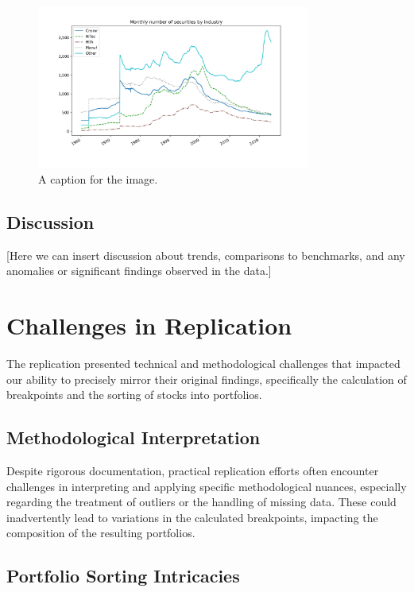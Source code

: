 \documentclass{article}
\begin{document}
\begin{figure}[ht]
  \centering
  \includegraphics[width=0.8\textwidth]{output/sec_per_ind_5.png}
  \caption{A caption for the image.}
  \label{fig:my_label}
\end{figure}



\subsection*{Discussion}

[Here we can insert discussion about trends, comparisons to benchmarks, and any anomalies or significant findings observed in the data.]


\section*{Challenges in Replication}

The replication presented technical and methodological challenges that impacted our ability to precisely mirror their original findings, specifically the calculation of breakpoints and the sorting of stocks into portfolios.

\subsection*{Methodological Interpretation}

Despite rigorous documentation, practical replication efforts often encounter challenges in interpreting and applying specific methodological nuances, especially regarding the treatment of outliers or the handling of missing data. These could inadvertently lead to variations in the calculated breakpoints, impacting the composition of the resulting portfolios.

\subsection*{Portfolio Sorting Intricacies}
\end{document}

